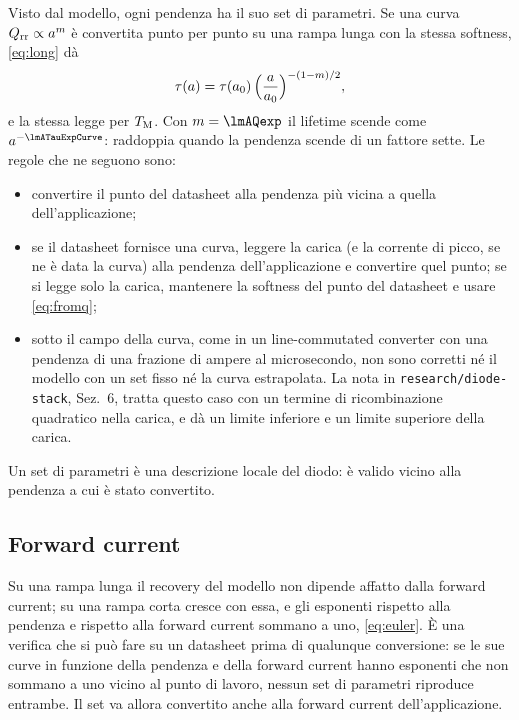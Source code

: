 \documentclass[10pt,a4paper]{scrartcl}
\let\newcommand\lmitdefine
\newcommand{\Qrr}{Q_\mathrm{rr}}
\newcommand{\TM}{T_\mathrm{M}}
\begin{document}
Visto dal modello, ogni pendenza ha il suo set di parametri. Se una curva $\Qrr \propto a^{m}$ è convertita punto per punto su una rampa lunga con la stessa softness, \eqref{eq:long} dà
\begin{equation}
\tau(a) = \tau(a_0)\,\Bigl(\frac{a}{a_0}\Bigr)^{-(1-m)/2} ,
\label{eq:taucurve}
\end{equation}
e la stessa legge per $\TM$. Con $m = \lmAQexp$ il lifetime scende come $a^{-\lmATauExpCurve}$: raddoppia quando la pendenza scende di un fattore sette. Le regole che ne seguono sono:
\begin{itemize}
\item convertire il punto del datasheet alla pendenza più vicina a quella dell'applicazione;
\item se il datasheet fornisce una curva, leggere la carica (e la corrente di picco, se ne è data la curva) alla pendenza dell'applicazione e convertire quel punto; se si legge solo la carica, mantenere la softness del punto del datasheet e usare \eqref{eq:fromq};
\item sotto il campo della curva, come in un line-commutated converter con una pendenza di una frazione di ampere al microsecondo, non sono corretti né il modello con un set fisso né la curva estrapolata. La nota in \texttt{research/diode-stack}, Sez.~6, tratta questo caso con un termine di ricombinazione quadratico nella carica, e dà un limite inferiore e un limite superiore della carica.
\end{itemize}
Un set di parametri è una descrizione locale del diodo: è valido vicino alla pendenza a cui è stato convertito.

\subsection{Forward current}
Su una rampa lunga il recovery del modello non dipende affatto dalla forward current; su una rampa corta cresce con essa, e gli esponenti rispetto alla pendenza e rispetto alla forward current sommano a uno, \eqref{eq:euler}. È una verifica che si può fare su un datasheet prima di qualunque conversione: se le sue curve in funzione della pendenza e della forward current hanno esponenti che non sommano a uno vicino al punto di lavoro, nessun set di parametri riproduce entrambe. Il set va allora convertito anche alla forward current dell'applicazione.
\end{document}
